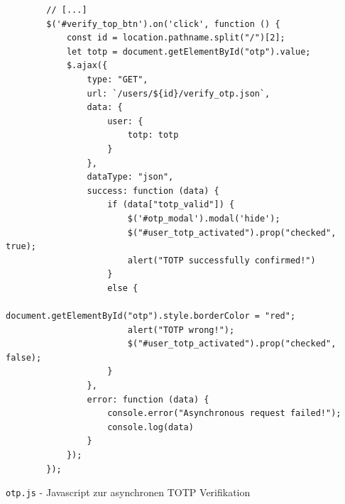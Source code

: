 \documentclass[11pt,a4paper,ngerman]{scrreprt}
\begin{document}
\begin{listing}[htpb]
    \begin{verbatim}
        // [...]
        $('#verify_top_btn').on('click', function () {
            const id = location.pathname.split("/")[2];
            let totp = document.getElementById("otp").value;
            $.ajax({
                type: "GET",
                url: `/users/${id}/verify_otp.json`,
                data: {
                    user: {
                        totp: totp
                    }
                },
                dataType: "json",
                success: function (data) {
                    if (data["totp_valid"]) {
                        $('#otp_modal').modal('hide');
                        $("#user_totp_activated").prop("checked", true);
                        alert("TOTP successfully confirmed!")
                    }
                    else {
                        document.getElementById("otp").style.borderColor = "red";
                        alert("TOTP wrong!");
                        $("#user_totp_activated").prop("checked", false);
                    }
                },
                error: function (data) {
                    console.error("Asynchronous request failed!");
                    console.log(data)
                }
            });
        });
    \end{verbatim}
    \caption{\texttt{otp.js} - Javascript zur asynchronen TOTP Verifikation}
    \label{lst:otp.js}
\end{listing}
\clearpage
\end{document}
